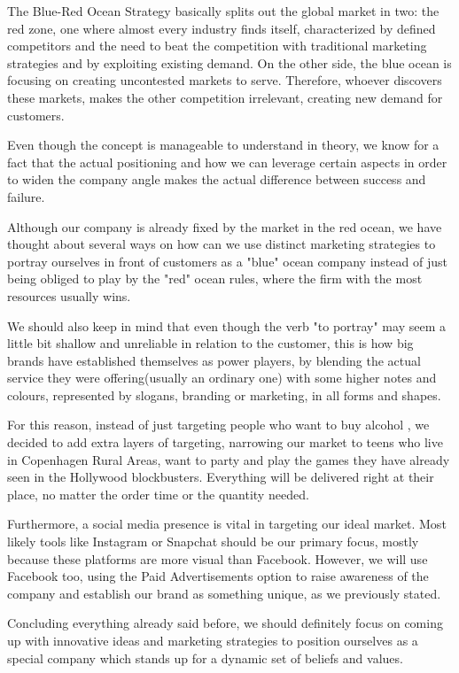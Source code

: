 \documentclass[12p]{article}
\begin{document}
The Blue-Red Ocean Strategy basically splits out the global market in two: the red zone, one where almost every industry finds itself, characterized by defined competitors and the need to beat the competition with traditional marketing strategies and by exploiting existing demand.
On the other side, the blue ocean is focusing on creating uncontested markets to serve. Therefore, whoever discovers these markets, makes the other competition irrelevant, creating new demand for customers.\cite{BlueOceanRedOcean}

Even though the concept is manageable to understand in theory, we know for a fact that the actual positioning and how we can leverage certain aspects in order to widen the company angle makes the actual difference between success and failure.

Although our company is already fixed by the market in the red ocean, we have thought about several ways on how can we use distinct marketing strategies to portray ourselves in front of customers as a "blue" ocean company instead of just being obliged to play by the "red" ocean rules, where the firm with the most resources usually wins.

We should also keep in mind that even though the verb "to portray" may seem a little bit shallow and unreliable in relation to the customer, this is how big brands have established themselves as power players, by blending the actual service they were offering(usually an ordinary one) with some higher notes and colours, represented by slogans, branding or marketing, in all forms and shapes.

For this reason, instead of just targeting people who want to buy alcohol , we decided to add extra layers of targeting, narrowing our market to teens who live in Copenhagen Rural Areas, want to party and play the games they have already seen in the Hollywood blockbusters. Everything will be delivered right at their place, no matter the order time or the quantity needed.

Furthermore, a social media presence is vital in targeting our ideal market. Most likely tools like Instagram or Snapchat should be our primary focus, mostly because these platforms are more visual than Facebook. However, we will use Facebook too, using the Paid Advertisements option to raise awareness of the company and establish our brand as something unique, as we previously stated. 

Concluding everything already said before, we should definitely focus on coming up with innovative ideas and marketing strategies to position ourselves as a special company which stands up for a dynamic set of beliefs and values.
\end{document}
